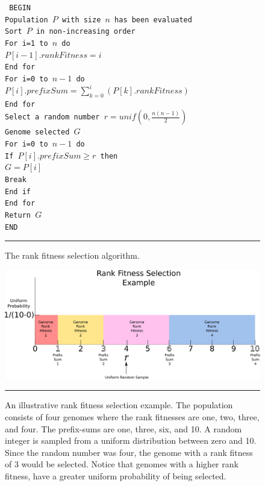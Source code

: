\begin{figure}[htbp]
\begin{center}
\begin{varwidth}{\textwidth}
{\tt
BEGIN \\
\tab Population $P$ with size $n$ has been evaluated \\
\tab Sort $P$ in non-increasing order \\
\tab For i=1 to $n$ do \\
\tab \tab $P[i-1].rankFitness = i$ \\
\tab End for \\
\tab For i=0 to $n-1$ do \\
\tab \tab $P[i].prefixSum = \sum\limits_{k=0}^i(P[k].rankFitness)$ \\
\tab End for \\
\tab Select a random number $r=unif\left(0,\frac{n(n-1)}{2}\right)$ \\
\tab Genome selected $G$ \\
\tab For i=0 to $n-1$ do \\
\tab \tab If $P[i].prefixSum \geq r $ then \\
\tab \tab \tab $G=P[i]$ \\
\tab \tab \tab Break \\
\tab \tab End if \\
\tab End for \\
\tab Return $G$ \\
END \\
}
\end{varwidth}
\end{center}
\centering
\rule{35em}{0.5pt}
\caption[Rank Fitness Selection Algorithm]{The rank fitness selection algorithm.}
\label{fig:rank_fitness_selection}
\end{figure}

\begin{figure}[ht!]
\centering
\includegraphics[scale=0.6]{../Figures/Chapter4/rank_fit_example.png}
\rule{35em}{0.5pt}
\caption[Rank Fitness Selection Illustration]{An illustrative rank fitness selection example. The population consists of four genomes where the rank fitnesses are one, two, three, and four. The prefix-sums are one, three, six, and 10. A random integer is sampled from a uniform distribution between zero and 10. Since the random number was four, the genome with a rank fitness of 3 would be selected. Notice that genomes with a higher rank fitness, have a greater uniform probability of being selected.}
\label{fig:rank_fit_example}
\end{figure}

